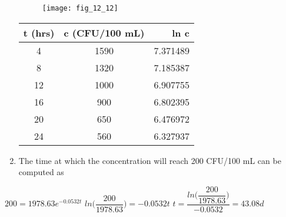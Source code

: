 \documentclass[../main.tex]{subfiles}
\begin{document}
\begin{enumerate}[label=\bfseries(\alph*)]
\begin{blockquote}
\end{blockquote}
	\bigbreak
	\begin{figure}[H]
		\texttt{[image: fig\_12\_12]}
		\label{fig:fig_12_12}
	\end{figure}
	\bigbreak
	\begin{tabular}{|c|c|r|}
		\hline t (hrs)&c (CFU/100 mL)&ln c\\ \hline
			4&1590&7.371489\\ \hline
			8&1320&7.185387\\ \hline
			12&1000&6.907755\\ \hline
			16&900&6.802395\\ \hline
			20&650&6.476972\\ \hline
			24&560&6.327937\\ \hline
	\end{tabular}
	\bigbreak
\item The time at which the concentration will reach 200 CFU/100 mL can be computed as
\end{enumerate}
	\bigbreak 
$200=1978.63e^{-0.0532t}$
	\bigbreak
$ln\Big(\dfrac{200}{1978.63}\Big)=-0.0532t$
	\bigbreak
$t=\dfrac{ln\Big(\dfrac{200}{1978.63}\Big)}{-0.0532}=43.08d$
	\bigbreak
\end{document}

